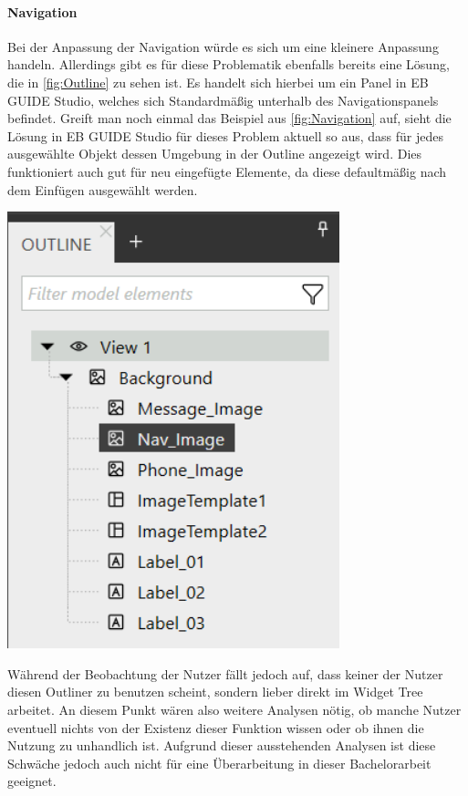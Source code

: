 \paragraph{Navigation}
Bei der Anpassung der Navigation würde es sich um eine kleinere Anpassung handeln.
Allerdings gibt es für diese Problematik ebenfalls bereits eine Lösung, die in \cref{fig:Outline} zu sehen ist.
Es handelt sich hierbei um ein Panel in EB GUIDE Studio, welches sich Standardmäßig unterhalb des Navigationspanels befindet.
Greift man noch einmal das Beispiel aus \cref{fig:Navigation} auf, sieht die Lösung in EB GUIDE Studio für dieses Problem aktuell so aus, dass für jedes ausgewählte Objekt dessen Umgebung in der Outline angezeigt wird.
Dies funktioniert auch gut für neu eingefügte Elemente, da diese defaultmäßig nach dem Einfügen ausgewählt werden.

\begin{center}
  \includegraphics[scale=0.6]{figures/Outline.png}
  \label{fig:Outline}
\end{center}

Während der Beobachtung der Nutzer fällt jedoch auf, dass keiner der Nutzer diesen Outliner zu benutzen scheint, sondern lieber direkt im Widget Tree arbeitet.
An diesem Punkt wären also weitere Analysen nötig, ob manche Nutzer eventuell nichts von der Existenz dieser Funktion wissen oder ob ihnen die Nutzung zu unhandlich ist.
Aufgrund dieser ausstehenden Analysen ist diese Schwäche jedoch auch nicht für eine Überarbeitung in dieser Bachelorarbeit geeignet.

